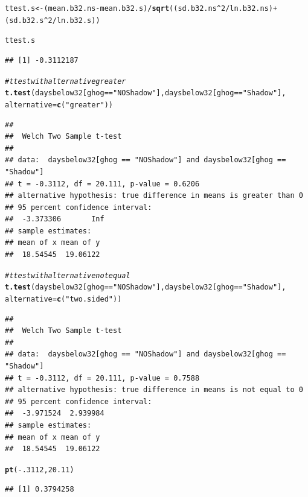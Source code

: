 \documentclass[12pt]{article}\usepackage[]{graphicx}\usepackage[]{color}
\makeatletter
\newcommand{\hlnum}[1]{\textcolor[rgb]{0.686,0.059,0.569}{#1}}%
\newcommand{\hlstr}[1]{\textcolor[rgb]{0.192,0.494,0.8}{#1}}%
\newcommand{\hlcom}[1]{\textcolor[rgb]{0.678,0.584,0.686}{\textit{#1}}}%
\newcommand{\hlopt}[1]{\textcolor[rgb]{0,0,0}{#1}}%
\newcommand{\hlstd}[1]{\textcolor[rgb]{0.345,0.345,0.345}{#1}}%
\newcommand{\hlkwb}[1]{\textcolor[rgb]{0.69,0.353,0.396}{#1}}%
\newcommand{\hlkwc}[1]{\textcolor[rgb]{0.333,0.667,0.333}{#1}}%
\newcommand{\hlkwd}[1]{\textcolor[rgb]{0.737,0.353,0.396}{\textbf{#1}}}%
\newenvironment{kframe}{%
 \def\at@end@of@kframe{}%
 \ifinner\ifhmode%
  \def\at@end@of@kframe{\end{minipage}}%
  \begin{minipage}{\columnwidth}%
 \fi\fi%
 \def\FrameCommand##1{\hskip\@totalleftmargin \hskip-\fboxsep
 \colorbox{shadecolor}{##1}\hskip-\fboxsep
     \hskip-\linewidth \hskip-\@totalleftmargin \hskip\columnwidth}%
 \MakeFramed {\advance\hsize-\width
   \@totalleftmargin\z@ \linewidth\hsize
   \@setminipage}}%
 {\par\unskip\endMakeFramed%
 \at@end@of@kframe}
\newenvironment{knitrout}{}{} %
\makeatother
\begin{document}
\begin{knitrout}
\color{fgcolor}\begin{kframe}
\begin{alltt}
\hlstd{ttest.s} \hlkwb{<-} \hlstd{(mean.b32.ns}\hlopt{-}\hlstd{mean.b32.s)}\hlopt{/}\hlkwd{sqrt}\hlstd{((sd.b32.ns}\hlopt{^}\hlnum{2}\hlopt{/}\hlstd{ln.b32.ns)} \hlopt{+}
                                           \hlstd{(sd.b32.s}\hlopt{^}\hlnum{2}\hlopt{/}\hlstd{ln.b32.s))}

\hlstd{ttest.s}
\end{alltt}
\begin{verbatim}
## [1] -0.3112187
\end{verbatim}
\begin{alltt}
\hlcom{#t test with alternative greater}
\hlkwd{t.test}\hlstd{(daysbelow32[ghog}\hlopt{==}\hlstr{"NOShadow"}\hlstd{],daysbelow32[ghog}\hlopt{==}\hlstr{"Shadow"}\hlstd{],}
       \hlkwc{alternative}\hlstd{=}\hlkwd{c}\hlstd{(}\hlstr{"greater"}\hlstd{))}
\end{alltt}
\begin{verbatim}
## 
## 	Welch Two Sample t-test
## 
## data:  daysbelow32[ghog == "NOShadow"] and daysbelow32[ghog == "Shadow"]
## t = -0.3112, df = 20.111, p-value = 0.6206
## alternative hypothesis: true difference in means is greater than 0
## 95 percent confidence interval:
##  -3.373306       Inf
## sample estimates:
## mean of x mean of y 
##  18.54545  19.06122
\end{verbatim}
\begin{alltt}
\hlcom{#t test with alternative not equal}
\hlkwd{t.test}\hlstd{(daysbelow32[ghog}\hlopt{==}\hlstr{"NOShadow"}\hlstd{],daysbelow32[ghog}\hlopt{==}\hlstr{"Shadow"}\hlstd{],}
       \hlkwc{alternative}\hlstd{=}\hlkwd{c}\hlstd{(}\hlstr{"two.sided"}\hlstd{))}
\end{alltt}
\begin{verbatim}
## 
## 	Welch Two Sample t-test
## 
## data:  daysbelow32[ghog == "NOShadow"] and daysbelow32[ghog == "Shadow"]
## t = -0.3112, df = 20.111, p-value = 0.7588
## alternative hypothesis: true difference in means is not equal to 0
## 95 percent confidence interval:
##  -3.971524  2.939984
## sample estimates:
## mean of x mean of y 
##  18.54545  19.06122
\end{verbatim}
\begin{alltt}
\hlkwd{pt}\hlstd{(}\hlopt{-}\hlnum{.3112}\hlstd{,}\hlnum{20.11}\hlstd{)}
\end{alltt}
\begin{verbatim}
## [1] 0.3794258
\end{verbatim}
\end{kframe}
\end{knitrout}
\end{document}
